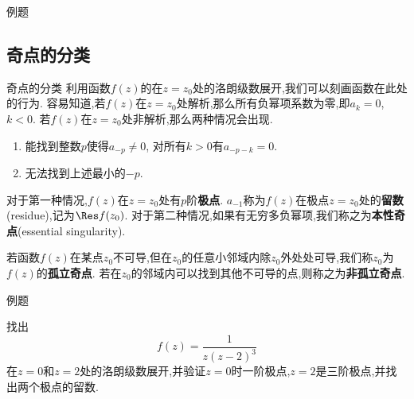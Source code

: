 \documentclass[fontset=windows, chinese, 10pt]{beamer}
\begin{document}
\begin{frame}{例题}
  \small
\end{frame}


\subsection{奇点的分类}
\label{subsec:singular_points}

\begin{frame}{奇点的分类}
  \small
利用函数$f(z)$的在$z=z_0$处的洛朗级数展开,我们可以刻画函数在此处的行为.
容易知道,若$f(z)$在$z=z_0$处解析,那么所有负幂项系数为零,即$a_k = 0$, $k<0$.
若$f(z)$在$z=z_0$处非解析,那么两种情况会出现.
\begin{enumerate}
    \item 能找到整数$p$使得$a_{-p} \neq 0$, 对所有$k>0$有$a_{-p - k}=0$.
    \item 无法找到上述最小的$-p$.
\end{enumerate}
对于第一种情况,$f(z)$在$z=z_0$处有$p$阶\textbf{极点}. $a_{-1}$称为$f(z)$在极点$z=z_0$处的\textbf{留数}(residue),记为$\Res f(z_0)$.
对于第二种情况,如果有无穷多负幂项,我们称之为\textbf{本性奇点}(essential singularity).

若函数$f(z)$在某点$z_0$不可导,但在$z_0$的任意小邻域内除$z_0$外处处可导,我们称$z_0$为$f(z)$的\textbf{孤立奇点}.
若在$z_0$的邻域内可以找到其他不可导的点,则称之为\textbf{非孤立奇点}.

\end{frame}

\begin{frame}{例题}
  \small

\begin{example}
找出\[
    f(z) = \frac{1}{z( z- 2)^3} 
    \]
    在$z=0$和$z=2$处的洛朗级数展开,并验证$z=0$时一阶极点,$z=2$是三阶极点,并找出两个极点的留数.
\end{example}

\end{frame}
\end{document}
